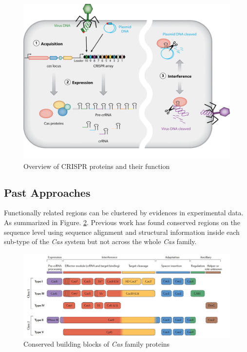 \documentclass[11pt, oneside]{article}
\begin{document}
\begin{figure}[ht]
  \centering
  \includegraphics[scale = 0.4]{images/crisprOverview}
      \caption{Overview of CRISPR proteins and their function ~\cite{annualreview}}
      \label{crisprOverview}
\end{figure}

\subsection{Past Approaches}
Functionally related regions can be clustered by evidences in experimental data. As summarized in Figure. \ref{buildingBlocks}. Previous work has found conserved regions on the sequence level  using sequence alignment and structural information\cite{preWork} inside each sub-type of the \textit{Cas} system but not across the whole \textit{Cas} family.

\begin{figure}[ht]
  \centering
  \includegraphics[scale = 0.35]{images/buildingBlocks}
      \caption{Conserved building blocks of \textit{Cas} family proteins \cite{buildingBlocks}}
      \label{buildingBlocks}
\end{figure}
\end{document}
